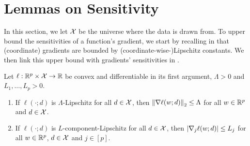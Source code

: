 
\section{Lemmas on Sensitivity}
\label{sec:lemma-sensitivity}


In this section, we let $\mathcal X$ be the universe where the data is drawn from.
To upper bound the sensitivities of a function's gradient, we start by
recalling in  that (coordinate) gradients are
bounded by (coordinate-wise-)Lipschitz constants.
We then link this upper bound with gradients' sensitivities in
.

\begin{lemma}
  \label{lemma:gradient-upper-bound}
  Let $\ell : \mathbb R^p \times \mathcal X \rightarrow \mathbb R$ be convex and differentiable
  in its first argument,
  $\Lambda > 0$ and $L_1, \dots, L_p > 0$.
  \begin{enumerate}
  \item If $\ell(\cdot; d)$ is $\Lambda$-Lipschitz for all $d \in \mathcal X$, then
    $\left \lVert \nabla \ell(w; d) \right \rVert_2 \le \Lambda$ for all $w \in \mathbb R^p$ and $d \in \mathcal X$.
  \item If $\ell(\cdot; d)$ is $L$-component-Lipschitz for all $d \in \mathcal X$, then
    $\left| \nabla_j \ell(w; d) \right| \le L_j$ for all $w \in \mathbb R^p$, $d \in \mathcal X$
    and $j \in [p]$.
  \end{enumerate}
\end{lemma}

